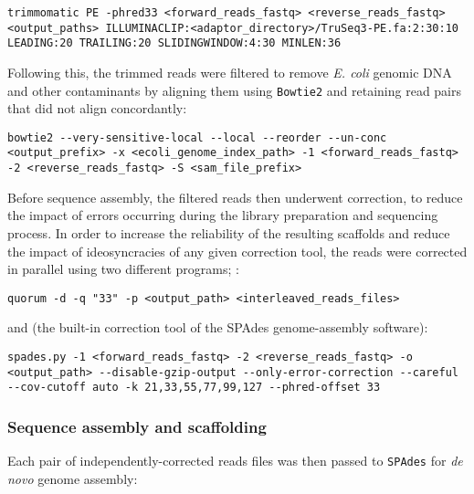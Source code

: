 \begin{lstlisting}
trimmomatic PE -phred33 <forward_reads_fastq> <reverse_reads_fastq> <output_paths> ILLUMINACLIP:<adaptor_directory>/TruSeq3-PE.fa:2:30:10 LEADING:20 TRAILING:20 SLIDINGWINDOW:4:30 MINLEN:36
\end{lstlisting}

Following this, the trimmed reads were filtered to remove \textit{E. coli} genomic DNA and other contaminants by aligning them using \lstinline{Bowtie2} \parencite{langmead2012bowtie2} and retaining read pairs that did not align concordantly:

\begin{lstlisting}
bowtie2 --very-sensitive-local --local --reorder --un-conc <output_prefix> -x <ecoli_genome_index_path> -1 <forward_reads_fastq> -2 <reverse_reads_fastq> -S <sam_file_prefix>
\end{lstlisting}


Before sequence assembly, the filtered reads then underwent correction, to reduce the impact of errors occurring during the library preparation and sequencing process. In order to increase the reliability of the resulting scaffolds and reduce the impact of ideosyncracies of any given correction tool, the reads were corrected in parallel using two different programs; :

\begin{lstlisting}
quorum -d -q "33" -p <output_path> <interleaved_reads_files>
\end{lstlisting}

\noindent and  (the built-in correction tool of the SPAdes genome-assembly software):

\begin{lstlisting}
spades.py -1 <forward_reads_fastq> -2 <reverse_reads_fastq> -o <output_path> --disable-gzip-output --only-error-correction --careful --cov-cutoff auto -k 21,33,55,77,99,127 --phred-offset 33
\end{lstlisting}

\subsubsection{Sequence assembly and scaffolding}
\label{sec:methods_comp_bacs_assembly}

Each pair of independently-corrected reads files was then passed to \lstinline{SPAdes} for \textit{de novo} genome assembly:

